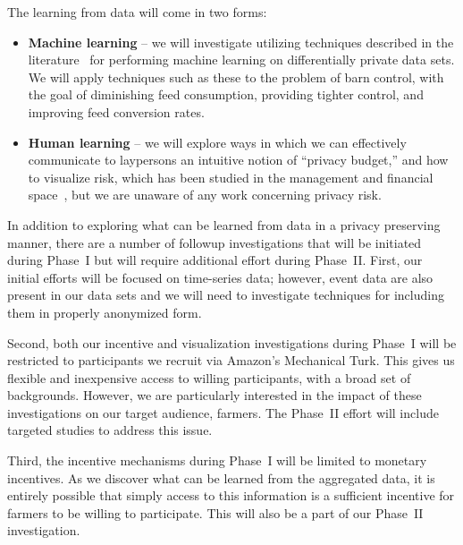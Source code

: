The learning from data will come in two forms:
\begin{itemize}
\item {\bf Machine learning} -- we will investigate utilizing techniques
described in the literature~\cite{acgmmtz16,fs10,ss15} for performing machine
learning on differentially private data sets.
We will apply techniques such as these to the problem of barn
control, with the goal of diminishing feed consumption, providing
tighter control, and improving feed conversion rates.
\item {\bf Human learning} -- we will explore ways in which we can effectively
communicate to laypersons an intuitive notion of ``privacy budget,'' and
how to visualize risk, which has been studied in the
management and
financial space~\cite{Eppler09,Sarlin16}, but we are unaware of any
work concerning privacy risk.
\end{itemize}

In addition to exploring what can be learned from data in a privacy
preserving manner, there are a number of followup investigations that
will be initiated during Phase~I but will require additional effort
during Phase~II.  First, our initial efforts will be focused on time-series
data; however, event data are also present in our data sets and we will
need to investigate techniques for including them in properly anonymized
form.

Second, both our incentive and visualization investigations during
Phase~I will be restricted to participants we recruit via Amazon's
Mechanical Turk.  This gives us flexible and inexpensive access to
willing participants, with a broad set of backgrounds.  However, we are
particularly interested in the impact of these investigations on our target
audience, farmers.  The Phase~II effort will include targeted studies
to address this issue.

Third, the incentive mechanisms during Phase~I will be limited to monetary
incentives.  As we discover what can be learned from the aggregated data,
it is entirely possible that simply access to this information is a
sufficient incentive for farmers to be willing to participate.  This will
also be a part of our Phase~II investigation.
